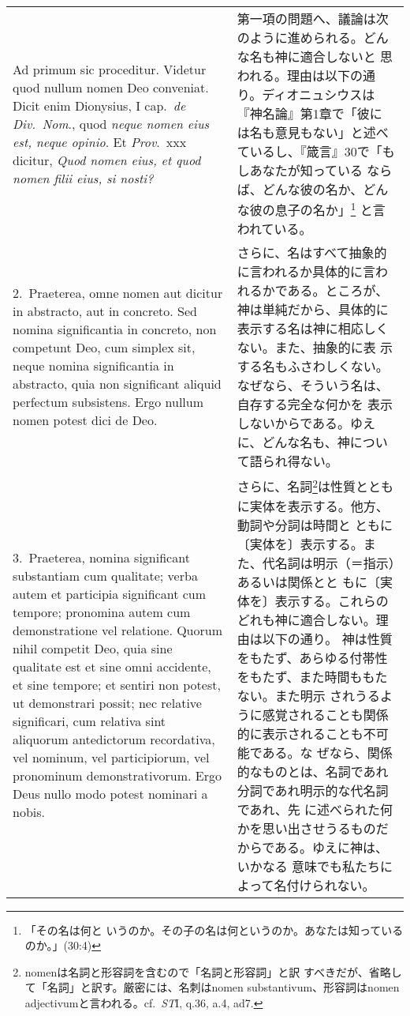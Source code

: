 \documentclass[10pt]{jsarticle}
\begin{document}
\begin{longtable}{p{21em}p{21em}}

{\sc Ad primum sic proceditur}. Videtur quod nullum nomen Deo
conveniat. Dicit enim Dionysius, I cap.\ {\it de Div.\ Nom}., quod {\it neque nomen
eius est, neque opinio}. Et {\it Prov}.\ {\sc xxx} dicitur, {\it Quod nomen eius, et quod nomen filii eius, si nosti?}

&

第一項の問題へ、議論は次のように進められる。どんな名も神に適合しないと
思われる。理由は以下の通り。ディオニュシウスは『神名論』第1章で「彼に
は名も意見もない」と述べているし、『箴言』30で「もしあなたが知っている
ならば、どんな彼の名か、どんな彼の息子の名か」\footnote{「その名は何と
いうのか。その子の名は何というのか。あなたは知っているのか。」(30:4)}
と言われている。

\\

2.~{\sc Praeterea}, omne nomen aut dicitur in abstracto, aut in
concreto. Sed nomina significantia in concreto, non competunt Deo, cum
simplex sit, neque nomina significantia in abstracto, quia non
significant aliquid perfectum subsistens. Ergo nullum nomen potest
dici de Deo.

&

さらに、名はすべて抽象的に言われるか具体的に言われるかである。ところが、
神は単純だから、具体的に表示する名は神に相応しくない。また、抽象的に表
示する名もふさわしくない。なぜなら、そういう名は、自存する完全な何かを
表示しないからである。ゆえに、どんな名も、神について語られ得ない。

\\

3.~{\sc Praeterea}, nomina significant substantiam cum qualitate;
verba autem et participia significant cum tempore; pronomina autem cum
demonstratione vel relatione. Quorum nihil competit Deo, quia sine
qualitate est et sine omni accidente, et sine tempore; et sentiri non
potest, ut demonstrari possit; nec relative significari, cum relativa
sint aliquorum antedictorum recordativa, vel nominum, vel
participiorum, vel pronominum demonstrativorum. Ergo Deus nullo modo
potest nominari a nobis.

&

さらに、名詞\footnote{nomenは名詞と形容詞を含むので「名詞と形容詞」と訳
すべきだが、省略して「名詞」と訳す。厳密には、名刺はnomen
substantivum、形容詞はnomen adjectivumと言われる。cf.~{\itshape ST}I,
q.36, a.4, ad7.}は性質とともに実体を表示する。他方、動詞や分詞は時間と
ともに〔実体を〕表示する。また、代名詞は明示（＝指示）あるいは関係とと
もに〔実体を〕表示する。これらのどれも神に適合しない。理由は以下の通り。
神は性質をもたず、あらゆる付帯性をもたず、また時間ももたない。また明示
されうるように感覚されることも関係的に表示されることも不可能である。な
ぜなら、関係的なものとは、名詞であれ分詞であれ明示的な代名詞であれ、先
に述べられた何かを思い出させうるものだからである。ゆえに神は、いかなる
意味でも私たちによって名付けられない。


\end{longtable}
\end{document}
